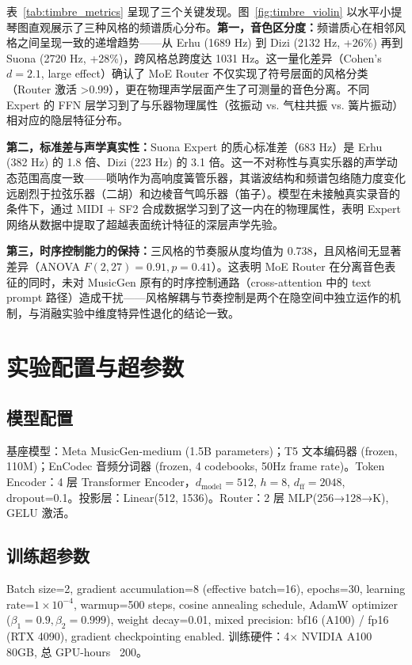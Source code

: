 \documentclass[11pt,twocolumn]{article}
\begin{document}
表~\ref{tab:timbre_metrics} 呈现了三个关键发现。图~\ref{fig:timbre_violin} 以水平小提琴图直观展示了三种风格的频谱质心分布。\textbf{第一，音色区分度：}频谱质心在相邻风格之间呈现一致的递增趋势——从 Erhu (1689 Hz) 到 Dizi (2132 Hz, +26\%) 再到 Suona (2720 Hz, +28\%)，跨风格总跨度达 1031 Hz。这一量化差异（Cohen's $d = 2.1$, large effect）确认了 MoE Router 不仅实现了符号层面的风格分类（Router 激活 >0.99），更在物理声学层面产生了可测量的音色分离。不同 Expert 的 FFN 层学习到了与乐器物理属性（弦振动 vs. 气柱共振 vs. 簧片振动）相对应的隐层特征分布。

\textbf{第二，标准差与声学真实性：}Suona Expert 的质心标准差（683 Hz）是 Erhu (382 Hz) 的 1.8 倍、Dizi (223 Hz) 的 3.1 倍。这一不对称性与真实乐器的声学动态范围高度一致——唢呐作为高响度簧管乐器，其谐波结构和频谱包络随力度变化远剧烈于拉弦乐器（二胡）和边棱音气鸣乐器（笛子）。模型在未接触真实录音的条件下，通过 MIDI + SF2 合成数据学习到了这一内在的物理属性，表明 Expert 网络从数据中提取了超越表面统计特征的深层声学先验。

\textbf{第三，时序控制能力的保持：}三风格的节奏服从度均值为 0.738，且风格间无显著差异（ANOVA $F(2,27)=0.91, p=0.41$）。这表明 MoE Router 在分离音色表征的同时，未对 MusicGen 原有的时序控制通路（cross-attention 中的 text prompt 路径）造成干扰——风格解耦与节奏控制是两个在隐空间中独立运作的机制，与消融实验中维度特异性退化的结论一致。


\newpage
\appendix
\section{实验配置与超参数}

\subsection{模型配置}
基座模型：Meta MusicGen-medium (1.5B parameters)；T5 文本编码器 (frozen, 110M)；EnCodec 音频分词器 (frozen, 4 codebooks, 50Hz frame rate)。Token Encoder：4 层 Transformer Encoder，$d_{\text{model}}=512$, $h=8$, $d_{\text{ff}}=2048$, dropout=0.1。投影层：Linear(512, 1536)。Router：2 层 MLP(256→128→K), GELU 激活。

\subsection{训练超参数}
Batch size=2, gradient accumulation=8 (effective batch=16), epochs=30, learning rate=$1\times10^{-4}$, warmup=500 steps, cosine annealing schedule, AdamW optimizer ($\beta_1=0.9,\beta_2=0.999$), weight decay=0.01, mixed precision: bf16 (A100) / fp16 (RTX 4090), gradient checkpointing enabled. 训练硬件：4× NVIDIA A100 80GB, 总 GPU-hours ~200。
\end{document}
